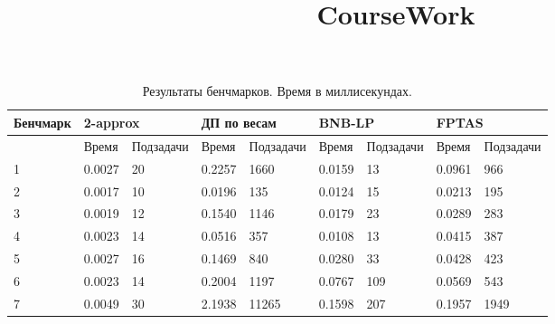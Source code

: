 \documentclass{article}
\title{CourseWork}
\author{}
\date{}
\begin{document}
\setlength{\parindent}{35pt}
\setlength{\footnotemargin}{5pt}
\sloppy
\frenchspacing %



\begin{table}[!h]
    \begin{center}
        \begin{tabular}{ | m{4.1em} | m{3em} | m{4.5em} | m{3em} | m{4.5em} | m{3em} | m{4.5em}| m{3em} | m{4.5em}|}
            \hline
            Бенчмарк & \multicolumn{2}{p{7.5em}|}{2-approx} & \multicolumn{2}{p{7.5em}|}{ДП по весам} & \multicolumn{2}{p{7.5em}|}{BNB-LP} & \multicolumn{2}{p{7.5em}|}{FPTAS}                                           \\
            \hline
                     & Время                                & Подзадачи                               & Время                              & Подзадачи                         & Время  & Подзадачи & Время  & Подзадачи \\
            \hline
            1        & 0.0027                               & 20                                      & 0.2257                             & 1660                              & 0.0159 & 13        & 0.0961 & 966       \\
            \hline
            2        & 0.0017                               & 10                                      & 0.0196                             & 135                               & 0.0124 & 15        & 0.0213 & 195       \\
            \hline
            3        & 0.0019                               & 12                                      & 0.1540                             & 1146                              & 0.0179 & 23        & 0.0289 & 283       \\
            \hline
            4        & 0.0023                               & 14                                      & 0.0516                             & 357                               & 0.0108 & 13        & 0.0415 & 387       \\
            \hline
            5        & 0.0027                               & 16                                      & 0.1469                             & 840                               & 0.0280 & 33        & 0.0428 & 423       \\
            \hline
            6        & 0.0023                               & 14                                      & 0.2004                             & 1197                              & 0.0767 & 109       & 0.0569 & 543       \\
            \hline
            7        & 0.0049                               & 30                                      & 2.1938                             & 11265                             & 0.1598 & 207       & 0.1957 & 1949      \\
            \hline
        \end{tabular}
        \caption{Результаты бенчмарков. Время в миллисекундах.}
    \end{center}
\end{table}
\end{document}
